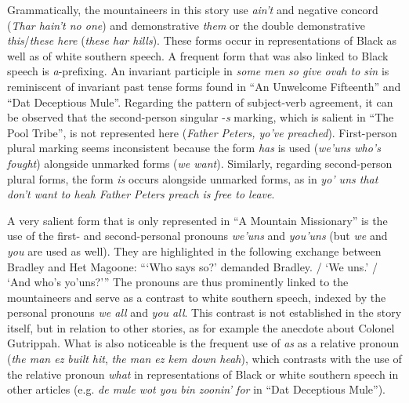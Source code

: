 \largerpage
Grammatically, the mountaineers in this story use \emph{ain’t} and negative concord (\emph{Thar hain’t no one}) and demonstrative \emph{them} or the double demonstrative \emph{this}/\emph{these here} (\emph{these har hills}). These forms occur in representations of Black as well as of white southern speech. A frequent form that was also linked to Black speech is \emph{a}{}-prefixing. An invariant participle in \emph{some men so give ovah to sin} is reminiscent of invariant past tense forms found in “An Unwelcome Fifteenth” and “Dat Deceptious Mule”. Regarding the pattern of subject-verb agreement, it can be observed that the second-person singular -\emph{s} marking, which is salient in “The Pool Tribe”, is not represented here (\emph{Father Peters, yo’ve preached}). First-person plural marking seems inconsistent because the form \emph{has} is used (\emph{we’uns who’s fought}) alongside unmarked forms (\emph{we want}). Similarly, regarding second-person plural forms, the form \emph{is} occurs alongside unmarked forms, as in \emph{yo’ uns that don’t want to heah Father Peters preach is free to leave}.

A very salient form that is only represented in “A Mountain Missionary” is the use of the first- and second-personal pronouns \emph{we’uns} and \emph{you’uns} (but \emph{we} and \emph{you} are used as well). They are highlighted in the following exchange between Bradley and Het Magoone: “‘Who says so?’ demanded Bradley. / ‘We uns.’ / ‘And who’s yo’uns?’” The pronouns are thus prominently linked to the mountaineers and serve as a contrast to white southern speech, indexed by the personal pronouns \emph{we all} and \emph{you all}. This contrast is not established in the story itself, but in relation to other stories, as for example the anecdote about Colonel Gutrippah. What is also noticeable is the frequent use of \emph{as} as a relative pronoun (\emph{the man ez built hit}, \emph{the man ez kem down heah}), which contrasts with the use of the relative pronoun \emph{what} in representations of Black or white southern speech in other articles (e.g. \emph{de mule wot you bin zoonin’ for} in “Dat Deceptious Mule”).

